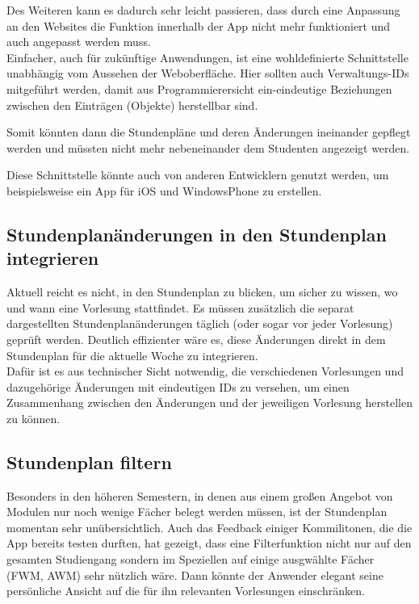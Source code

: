 \documentclass{article}
\begin{document}
Des Weiteren kann es dadurch sehr leicht passieren, dass durch eine Anpassung an den Websites die Funktion innerhalb der App nicht mehr funktioniert und auch angepasst werden muss. 
\\
Einfacher, auch für zukünftige Anwendungen, ist eine wohldefinierte Schnittstelle unabhängig vom Aussehen der Weboberfläche. Hier sollten auch Verwaltungs-IDs mitgeführt werden, 
damit aus Programmierersicht ein-eindeutige Beziehungen zwischen den Einträgen (Objekte) herstellbar sind.

Somit könnten dann die Stundenpläne und deren Änderungen ineinander gepflegt werden und müssten nicht mehr nebeneinander dem Studenten angezeigt werden.

Diese Schnittstelle könnte auch von anderen Entwicklern genutzt werden, um beispielsweise ein App für iOS und WindowsPhone zu erstellen. 


\subsection{Stundenplanänderungen in den Stundenplan integrieren}
\label{integrieren}
Aktuell reicht es nicht, in den Stundenplan zu blicken, um sicher zu wissen, wo und wann eine Vorlesung stattfindet. 
Es müssen zusätzlich die separat dargestellten Stundenplanänderungen täglich (oder sogar vor jeder Vorlesung) geprüft werden. 
Deutlich effizienter wäre es, diese Änderungen direkt in dem Stundenplan für die aktuelle Woche zu integrieren. \\

Dafür ist es aus technischer Sicht notwendig, die verschiedenen Vorlesungen und dazugehörige Änderungen mit eindeutigen IDs zu versehen,
 um einen Zusammenhang zwischen den Änderungen und der jeweiligen Vorlesung herstellen zu können.

\subsection{Stundenplan filtern}

Besonders in den höheren Semestern, in denen aus einem großen Angebot von Modulen nur noch wenige Fächer belegt werden müssen, 
ist der Stundenplan momentan sehr unübersichtlich. Auch das Feedback einiger Kommilitonen, die die App bereits testen durften, hat gezeigt, 
dass eine Filterfunktion nicht nur auf den gesamten Studiengang sondern im Speziellen auf einige ausgwählte Fächer (FWM, AWM) sehr nützlich wäre. 
Dann könnte der Anwender elegant seine persönliche Ansicht auf die für ihn relevanten Vorlesungen einschränken. \\
\end{document}
